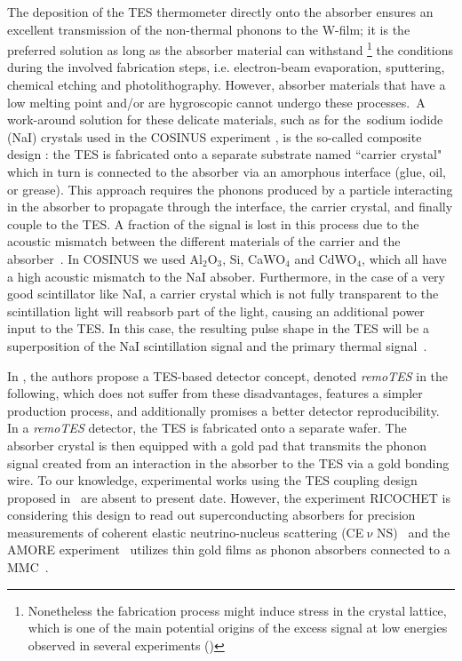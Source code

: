 \documentclass[superscriptaddress,nofootinbib ]{revtex4-2}
\begin{document}
The deposition of the TES thermometer directly onto the absorber ensures an excellent transmission of the non-thermal phonons to the W-film; it is the preferred solution as long as the absorber material can withstand \footnote{Nonetheless the fabrication process might induce stress in the crystal lattice, which is one of the main potential origins of the excess signal at low energies observed in several experiments (\cite{Proceedings:2022hmu})} the conditions during the involved fabrication steps, i.e. electron-beam evaporation, sputtering, chemical etching and photolithography. However, absorber materials that have a low melting point and/or are hygroscopic cannot undergo these processes.~A work-around solution for these delicate materials, such as for the~sodium iodide (NaI) crystals used in the COSINUS experiment \cite{angloher_cosinus_2016}, is the so-called composite design \cite{kiefer_composite_2009}: the TES is fabricated onto a separate substrate named ``carrier crystal" which in turn is connected to the absorber via an amorphous interface (glue, oil, or grease). This approach requires the phonons produced by a particle interacting in the absorber to propagate through the interface, the carrier crystal, and finally couple to the TES. A fraction of the signal is lost in this process due to the acoustic mismatch between the different materials of the carrier and the absorber~\cite{gray2012nonequilibrium}. In COSINUS we used Al$_{2}$O$_{3}$, Si, CaWO$_4$ and CdWO$_4$, which all have a high acoustic mismatch to the NaI absober.  Furthermore, in the case of a very good scintillator like NaI, a carrier crystal which is not fully transparent to the scintillation light will reabsorb part of the light, causing an additional power input to the TES. In this case, the resulting pulse shape in the TES will be a superposition of the NaI scintillation signal and the primary thermal signal~\cite{Zema:2020mkm}.

In \cite{pyle2015optimized}, the authors propose a TES-based detector concept, denoted \textit{remoTES} in the following, which does not suffer from these disadvantages, features a simpler production process, and additionally promises a better detector reproducibility. In a \textit{remoTES} detector, the TES is fabricated onto a separate wafer. The absorber crystal is then equipped with a gold pad that transmits the phonon signal created from an interaction in the absorber to the TES via a gold bonding wire. 
To our knowledge, experimental works using the TES coupling design proposed in~\cite{pyle2015optimized}  are absent to present date. However, the experiment RICOCHET is considering this design to read out superconducting absorbers for precision measurements of coherent elastic neutrino-nucleus scattering (CE$\upnu$NS)~\cite{Chen:2021tap} and the AMORE experiment~\cite{Alenkov:2019jis} utilizes thin gold films as phonon absorbers connected to a MMC~\cite{KIM2004208}.
\end{document}
